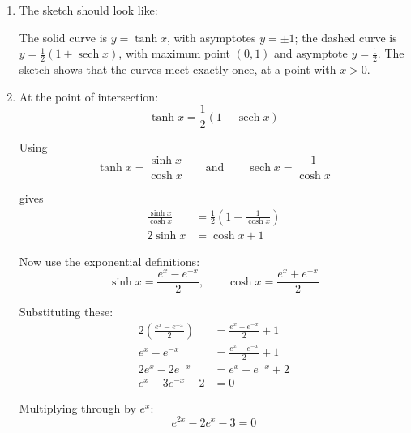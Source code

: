 \documentclass[leqno]{article}
\begin{document}
\begin{enumerate}[
  label=\textbf{\arabic*.},
  leftmargin=*,
  topsep=0pt,
  partopsep=0pt,
  parsep=0pt
]
\vspace*{10pt}

\begin{djsSolution}
\begin{enumerate}[label=\textbf{(\alph*)}]
  \item The sketch should look like:\par\nopagebreak



The solid curve is \(y=\tanh x\), with asymptotes \(y=\pm 1\); the dashed curve is \(y=\frac12(1+\operatorname{sech}x)\), with maximum point \((0,1)\) and asymptote \(y=\frac12\). The sketch shows that the curves meet exactly once, at a point with \(x>0\).

  \item At the point of intersection:
\[
\tanh x=\frac12(1+\operatorname{sech}x)
\]

Using
\[
\tanh x=\frac{\sinh x}{\cosh x}
\qquad\text{and}\qquad
\operatorname{sech}x=\frac{1}{\cosh x}
\]

gives
\begin{align*}
\frac{\sinh x}{\cosh x} &= \frac12\left(1+\frac{1}{\cosh x}\right) \\
2\sinh x &= \cosh x+1
\end{align*}

Now use the exponential definitions:
\[
\sinh x=\frac{e^x-e^{-x}}{2},\qquad \cosh x=\frac{e^x+e^{-x}}{2}
\]

Substituting these:
\begin{align*}
2\left(\frac{e^x-e^{-x}}{2}\right) &= \frac{e^x+e^{-x}}{2}+1 \\
e^x-e^{-x} &= \frac{e^x+e^{-x}}{2}+1 \\
2e^x-2e^{-x} &= e^x+e^{-x}+2 \\
e^x-3e^{-x}-2 &= 0
\end{align*}

Multiplying through by \(e^x\):
\[
e^{2x}-2e^x-3=0
\]


\end{enumerate}
\end{djsSolution}
\end{enumerate}
\end{document}
